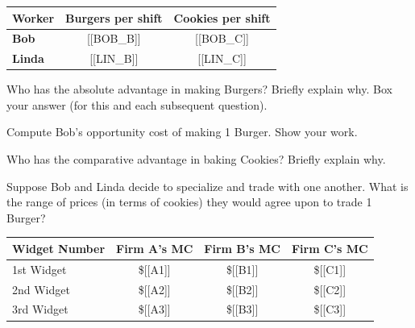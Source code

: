 
\begin{center}
    \renewcommand{\arraystretch}{1.5}
    \begin{tabular}{|l|c|c|}
        \hline
        \textbf{Worker} & \textbf{Burgers per shift} & \textbf{Cookies per shift} \\
        \hline
        \textbf{Bob}    & [[BOB_B]]                  & [[BOB_C]]                  \\
        \hline
        \textbf{Linda}  & [[LIN_B]]                  & [[LIN_C]]                  \\
        \hline
    \end{tabular}
\end{center}

\begin{subquestions}
    \item Who has the absolute advantage in making Burgers? Briefly explain why. Box your answer (for this and each subsequent question).
    \item Compute Bob's opportunity cost of making 1 Burger. Show your work.
    \item Who has the comparative advantage in baking Cookies? Briefly explain why.
    \item Suppose Bob and Linda decide to specialize and trade with one another. What is the range of prices (in terms of cookies) they would agree upon to trade 1 Burger?
\end{subquestions}



\begin{center}
    \renewcommand{\arraystretch}{1.5}
    \begin{tabular}{|l|c|c|c|}
        \hline
        \textbf{Widget Number} & \textbf{Firm A's MC} & \textbf{Firm B's MC} & \textbf{Firm C's MC} \\
        \hline
        1st Widget             & \$[[A1]]             & \$[[B1]]             & \$[[C1]]             \\
        \hline
        2nd Widget             & \$[[A2]]             & \$[[B2]]             & \$[[C2]]             \\
        \hline
        3rd Widget             & \$[[A3]]             & \$[[B3]]             & \$[[C3]]             \\
        \hline
    \end{tabular}
\end{center}

